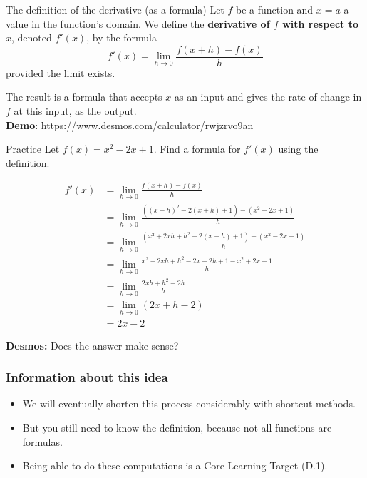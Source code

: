 \documentclass{beamer}
\begin{document}
\begin{frame}

    \begin{alertblock}{The definition of the derivative (as a formula)}
        Let $f$ be a function and $x=a$ a value in the function's domain. We define the \textbf{derivative of $f$ with respect to $x$}, denoted $f'(x)$, by the formula
        $$f'(x) = \lim_{h \to 0} \frac{f(x+h) - f(x)}{h}$$
        provided the limit exists. 
    \end{alertblock}

The result is a \alert{formula} that accepts $x$ as an input and gives the \alert{rate of change in $f$} at this input, as the output. \\

\textbf{Demo}: https://www.desmos.com/calculator/rwjzrvo9an 

\end{frame}


\begin{frame}

    \begin{exampleblock}{Practice}
        Let $f(x) = x^2 - 2x + 1$. Find a formula for $f'(x)$ using the definition. 
    \end{exampleblock}  \pause

    \begin{align*}
        f'(x) &= \lim_{h \to 0} \frac{f(x+h) - f(x)}{h} \\
        &= \lim_{h \to 0} \frac{((x+h)^2 - 2(x+h) + 1) - (x^2 - 2x + 1)}{h} \\
        &= \lim_{h \to 0} \frac{(x^2 + 2xh + h^2 - 2(x+h) + 1)- (x^2 - 2x + 1)}{h} \\
        &= \lim_{h \to 0} \frac{x^2 + 2xh + h^2 - 2x - 2h + 1 - x^2 + 2x - 1}{h} \\
        &= \lim_{h \to 0} \frac{2xh + h^2 - 2h}{h} \\
        &= \lim_{h \to 0} (2x + h  - 2) \\
        &= 2x - 2 
    \end{align*}

\textbf{Desmos:} Does the answer make sense? 

\end{frame}

\begin{frame}
    \frametitle{Information about this idea}

    \begin{itemize}
        \item We will eventually shorten this process considerably with \alert{shortcut methods}. 
        \item But you still need to know the definition, because \alert{not all functions are formulas}. 
        \item Being able to do these computations is a Core Learning Target (D.1). 
    \end{itemize}

\end{frame}
\end{document}
